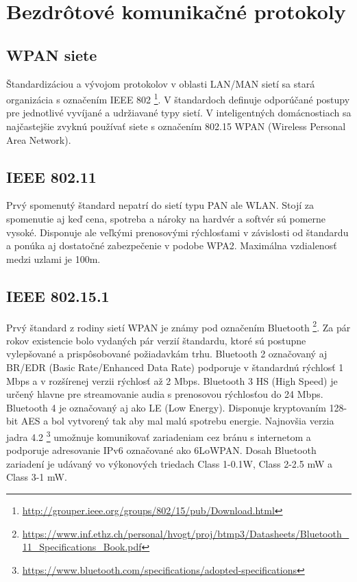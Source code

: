 \documentclass[12pt,a4wide,oneside,openright]{report}
\begin{document}
\section{Bezdrôtové komunikačné protokoly} \label{s_protocols}
\subsection{WPAN siete}
Štandardizáciou a vývojom protokolov v oblasti LAN/MAN sietí sa stará organizácia s označením IEEE
802 \footnote{\url{http://grouper.ieee.org/groups/802/15/pub/Download.html}}. V štandardoch definuje odporúčané postupy pre jednotlivé vyvíjané a udržiavané typy sietí. V
inteligentných domácnostiach sa najčastejšie zvyknú používať siete s označením 802.15 WPAN (Wireless Personal Area Network).
\subsection{IEEE 802.11}
Prvý spomenutý štandard nepatrí do sietí typu PAN ale WLAN. Stojí za spomenutie aj keď cena, spotreba a nároky na hardvér a softvér sú pomerne vysoké. Disponuje ale veľkými prenosovými rýchlosťami v závislosti od štandardu a ponúka aj dostatočné zabezpečenie v podobe WPA2. Maximálna vzdialenosť medzi uzlami je 100m. 
\subsection{IEEE 802.15.1}
Prvý štandard z rodiny sietí WPAN je známy pod označením Bluetooth
\footnote{\url{https://www.inf.ethz.ch/personal/hvogt/proj/btmp3/Datasheets/Bluetooth_11_Specifications_Book.pdf}}. Za pár rokov existencie bolo vydaných pár verzií štandardu, ktoré sú postupne vylepšované a prispôsobované požiadavkám trhu.
Bluetooth 2 označovaný aj BR/EDR (Basic Rate/Enhanced Data Rate) podporuje v štandardnú rýchlosť 1 Mbps a v rozšírenej verzii rýchlosť až 2 Mbps.
Bluetooth 3 HS (High Speed) je určený hlavne pre streamovanie audia s prenosovou rýchlosťou do 24 Mbps.
Bluetooth 4 je označovaný aj ako LE (Low Energy). Disponuje kryptovaním 128-bit AES a bol vytvorený tak aby mal malú spotrebu energie. Najnovšia verzia jadra 4.2 \footnote{\url{https://www.bluetooth.com/specifications/adopted-specifications}} umožnuje komunikovať zariadeniam cez bránu s internetom a podporuje adresovanie IPv6 označované ako 6LoWPAN.
Dosah Bluetooth zariadení je udávaný vo výkonových triedach Class 1-0.1W, Class 2-2.5 mW a Class 3-1 mW.
\end{document}
